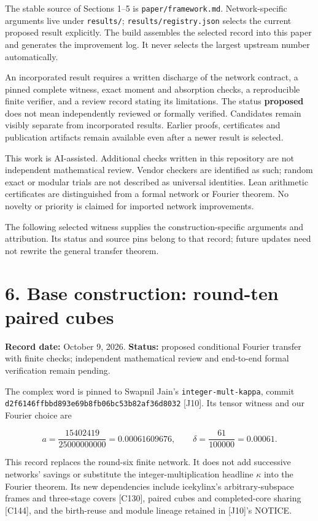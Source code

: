 \documentclass[
  11pt,
]{article}
\begin{document}
The stable source of Sections 1--5 is \texttt{paper/\allowbreak{}framework.md}.
Network-specific arguments live under \texttt{results/\allowbreak{}};
\texttt{results/\allowbreak{}registry.json} selects the current proposed result
explicitly. The build assembles the selected record into this paper and
generates the improvement log. It never selects the largest upstream
number automatically.

An incorporated result requires a written discharge of the network
contract, a pinned complete witness, exact moment and absorption checks,
a reproducible finite verifier, and a review record stating its
limitations. The status \textbf{proposed} does not mean independently
reviewed or formally verified. Candidates remain visibly separate from
incorporated results. Earlier proofs, certificates and publication
artifacts remain available even after a newer result is selected.

This work is AI-assisted. Additional checks written in this repository
are not independent mathematical review. Vendor checkers are identified
as such; random exact or modular trials are not described as universal
identities. Lean arithmetic certificates are distinguished from a formal
network or Fourier theorem. No novelty or priority is claimed for
imported network improvements.

The following selected witness supplies the construction-specific
arguments and attribution. Its status and source pins belong to that
record; future updates need not rewrite the general transfer theorem.

\section{6. Base construction: round-ten paired
cubes}\label{base-construction-round-ten-paired-cubes}

\textbf{Record date:} October 9, 2026. \textbf{Status:} proposed
conditional Fourier transfer with finite checks; independent
mathematical review and end-to-end formal verification remain pending.

The complex word is pinned to Swapnil Jain's
\texttt{integer-mult-kappa}, commit
\texttt{d2f6146ffb\allowbreak{}bd893e69b8\allowbreak{}fb06bc53b8\allowbreak{}2af36d8032} {[}J10{]}. Its tensor
witness and our Fourier choice are

\[
a=\frac{15402419}{25000000000}=0.00061609676,
\qquad \delta=\frac{61}{100000}=0.00061.
\tag{6.1}
\]

This record replaces the round-six finite network. It does not add
successive networks' savings or substitute the integer-multiplication
headline \(\kappa\) into the Fourier theorem. Its new dependencies
include icekylinx's arbitrary-subspace frames and three-stage covers
{[}C130{]}, paired cubes and completed-core sharing {[}C144{]}, and the
birth-reuse and module lineage retained in {[}J10{]}'s NOTICE.
\end{document}
